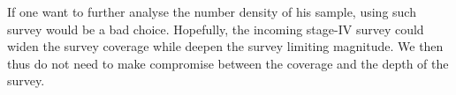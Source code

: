 \documentclass[fleqn,usenatbib]{mnras}
\begin{document}
If one want to further analyse the number density of his sample, using such survey would be a bad choice. Hopefully, the incoming stage-IV survey could widen the survey coverage while deepen the survey limiting magnitude. We then thus do not need to make compromise between the coverage and the depth of the survey.  
\end{document}
